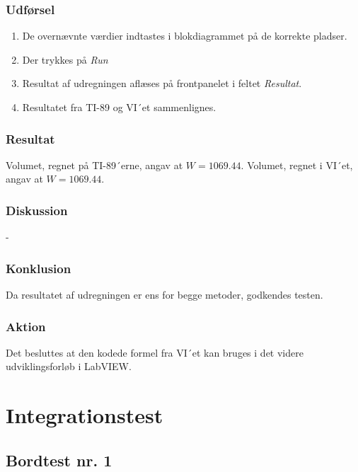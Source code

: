 	
	
		\subsubsection{Udførsel}
			 
         \begin{enumerate}
         \item De overnævnte værdier indtastes i blokdiagrammet på de korrekte pladser.
         \item Der trykkes på \textit{Run} 
         \item Resultat af udregningen aflæses på frontpanelet i feltet \textit{Resultat}. 
         \item Resultatet fra TI-89 og VI´et sammenlignes.  
         \end{enumerate}
         
        \subsubsection{Resultat}
        
        Volumet, regnet på TI-89´erne, angav at $W=1069.44$.
        Volumet, regnet i VI´et, angav at $W=1069.44$.

		\subsubsection{Diskussion} 
	-
	
	
		\subsubsection{Konklusion}
		 
	Da resultatet af udregningen er ens for begge metoder, godkendes testen. 
	
	   \subsubsection{Aktion}
Det besluttes at den kodede formel fra VI´et kan bruges i det videre udviklingsforløb i LabVIEW. 



\section{Integrationstest}

	\subsection{Bordtest nr. 1} %
	\label{bordtest1}
